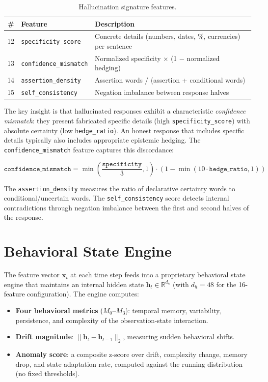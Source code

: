 \documentclass[11pt,a4paper]{article}
\begin{document}
\begin{table}[h]
\centering
\small
\begin{tabular}{cll}
\toprule
\textbf{\#} & \textbf{Feature} & \textbf{Description} \\
\midrule
12 & \texttt{specificity\_score} & Concrete details (numbers, dates, \%, currencies) per sentence \\
13 & \texttt{confidence\_mismatch} & Normalized specificity $\times$ (1 $-$ normalized hedging) \\
14 & \texttt{assertion\_density} & Assertion words / (assertion + conditional words) \\
15 & \texttt{self\_consistency} & Negation imbalance between response halves \\
\bottomrule
\end{tabular}
\caption{Hallucination signature features.}
\end{table}

The key insight is that hallucinated responses exhibit a characteristic \emph{confidence mismatch}: they present fabricated specific details (high \texttt{specificity\_score}) with absolute certainty (low \texttt{hedge\_ratio}). An honest response that includes specific details typically also includes appropriate epistemic hedging. The \texttt{confidence\_mismatch} feature captures this discordance:

\begin{equation}
    \texttt{confidence\_mismatch} = \min\!\left(\frac{\texttt{specificity}}{3}, 1\right) \cdot \left(1 - \min(10 \cdot \texttt{hedge\_ratio}, 1)\right)
\end{equation}

The \texttt{assertion\_density} measures the ratio of declarative certainty words to conditional/uncertain words. The \texttt{self\_consistency} score detects internal contradictions through negation imbalance between the first and second halves of the response.

\section{Behavioral State Engine}

The feature vector $\mathbf{x}_t$ at each time step feeds into a proprietary behavioral state engine that maintains an internal hidden state $\mathbf{h}_t \in \mathbb{R}^{d_h}$ (with $d_h = 48$ for the 16-feature configuration). The engine computes:

\begin{itemize}[nosep]
    \item \textbf{Four behavioral metrics} ($M_0$--$M_3$): temporal memory, variability, persistence, and complexity of the observation-state interaction.
    \item \textbf{Drift magnitude}: $\|\mathbf{h}_t - \mathbf{h}_{t-1}\|_2$, measuring sudden behavioral shifts.
    \item \textbf{Anomaly score}: a composite z-score over drift, complexity change, memory drop, and state adaptation rate, computed against the running distribution (no fixed thresholds).
\end{itemize}
\end{document}

